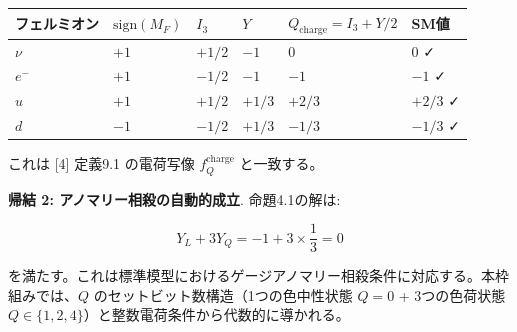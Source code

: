 \documentclass[
  a4paper,11pt]{ltjsarticle}
\newcounter{none} %
\begin{document}
{\def\LTcaptype{none} %
\begin{longtable}[]{@{}
  >{\raggedright\arraybackslash}p{}
  >{\centering\arraybackslash}p{}
  >{\centering\arraybackslash}p{}
  >{\centering\arraybackslash}p{}
  >{\centering\arraybackslash}p{}
  >{\centering\arraybackslash}p{}@{}}
\toprule\noalign{}
\begin{minipage}[b]{\linewidth}\raggedright
フェルミオン
\end{minipage} & \begin{minipage}[b]{\linewidth}\centering
\(\text{sign}(M_F)\)
\end{minipage} & \begin{minipage}[b]{\linewidth}\centering
\(I_3\)
\end{minipage} & \begin{minipage}[b]{\linewidth}\centering
\(Y\)
\end{minipage} & \begin{minipage}[b]{\linewidth}\centering
\(Q_{\text{charge}} = I_3 + Y/2\)
\end{minipage} & \begin{minipage}[b]{\linewidth}\centering
SM値
\end{minipage} \\
\midrule\noalign{}
\endhead
\bottomrule\noalign{}
\endlastfoot
\(\nu\) & \(+1\) & \(+1/2\) & \(-1\) & \(0\) & \(0\) ✓ \\
\(e^-\) & \(+1\) & \(-1/2\) & \(-1\) & \(-1\) & \(-1\) ✓ \\
\(u\) & \(+1\) & \(+1/2\) & \(+1/3\) & \(+2/3\) & \(+2/3\) ✓ \\
\(d\) & \(-1\) & \(-1/2\) & \(+1/3\) & \(-1/3\) & \(-1/3\) ✓ \\
\end{longtable}
}

これは {[}4{]} 定義9.1 の電荷写像 \(f_Q^{\text{charge}}\) と一致する。

\textbf{帰結 2: アノマリー相殺の自動的成立}. 命題4.1の解は:

\[Y_L + 3 Y_Q = -1 + 3 \times \frac{1}{3} = 0\]

を満たす。これは標準模型におけるゲージアノマリー相殺条件に対応する。本枠組みでは、\(Q\)
のセットビット数構造（1つの色中性状態 \(Q = 0\) + 3つの色荷状態
\(Q \in \{1,2,4\}\)）と整数電荷条件から代数的に導かれる。
\end{document}
